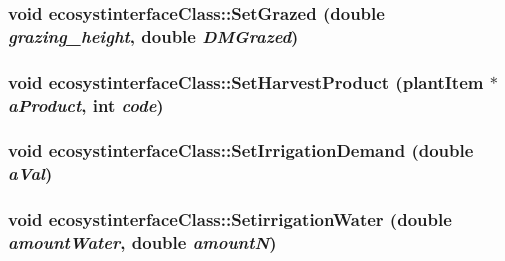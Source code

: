 \label{classecosystinterface_class_a5a1165ff5e89c95550b70b8406ac893f}
\hypertarget{classecosystinterface_class_ad4d491d184805cec838e20e55bfd6614}{
\subsubsection[{SetGrazed}]{\setlength{\rightskip}{0pt plus 5cm}void ecosystinterfaceClass::SetGrazed (double {\em grazing\_\-height}, \/  double {\em DMGrazed})}}
\label{classecosystinterface_class_ad4d491d184805cec838e20e55bfd6614}
\hypertarget{classecosystinterface_class_a0cc6cfd3137d581a9d2247dd5d20193b}{
\subsubsection[{SetHarvestProduct}]{\setlength{\rightskip}{0pt plus 5cm}void ecosystinterfaceClass::SetHarvestProduct ({\bf plantItem} $\ast$ {\em aProduct}, \/  int {\em code})}}
\label{classecosystinterface_class_a0cc6cfd3137d581a9d2247dd5d20193b}
\hypertarget{classecosystinterface_class_a9e7ecaf087027f2b1ce473ace863f13c}{
\subsubsection[{SetIrrigationDemand}]{\setlength{\rightskip}{0pt plus 5cm}void ecosystinterfaceClass::SetIrrigationDemand (double {\em aVal})}}
\label{classecosystinterface_class_a9e7ecaf087027f2b1ce473ace863f13c}
\hypertarget{classecosystinterface_class_ac8d26fd3ac8c4521bb697172b8f23af1}{
\subsubsection[{SetirrigationWater}]{\setlength{\rightskip}{0pt plus 5cm}void ecosystinterfaceClass::SetirrigationWater (double {\em amountWater}, \/  double {\em amountN})}}
